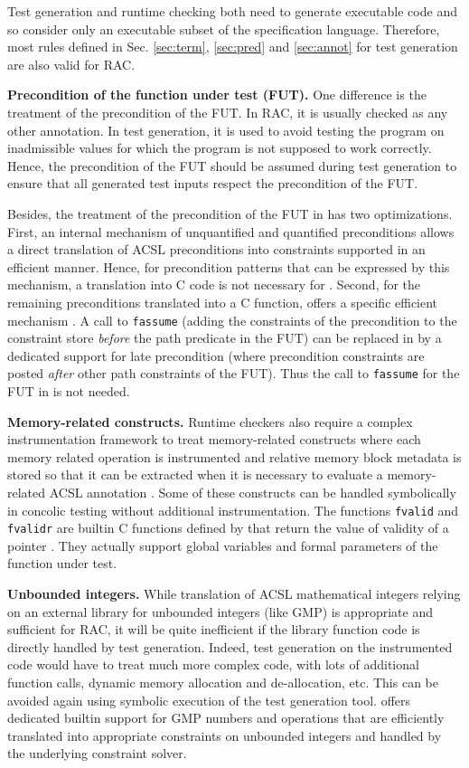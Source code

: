 Test generation and runtime checking both need to
generate executable code and so consider only an executable subset of the
specification language. 
Therefore, most rules defined in Sec. \ref{sec:term}, \ref{sec:pred} and \ref{sec:annot} 
for test generation are also valid for RAC.

\textbf{Precondition of the function under test (FUT).}
One difference is the treatment of the precondition of the FUT.
In RAC, it is usually checked as any other annotation.
In test generation, it is used to avoid testing the program on inadmissible values 
for which the program is not supposed to work correctly.
Hence, the precondition  of the FUT should be assumed during test generation
to ensure that all generated test inputs respect the precondition of the FUT.

Besides, the treatment of the precondition of the FUT in \pathcrawler has two optimizations.
First, an internal mechanism of unquantified and quantified preconditions
allows a direct translation of ACSL preconditions into constraints
supported in an efficient manner.
Hence, for precondition patterns that can be expressed by this mechanism,
a translation into C code is not necessary for \pathcrawler.
Second, for the remaining preconditions translated into a C function, 
\pathcrawler offers a specific
efficient mechanism \cite{Delahaye/RV13}.
A call to \lstinline|fassume| (adding the constraints of the
precondition to the constraint store \emph{before} the path predicate in the FUT)
can be replaced in \pathcrawler by a dedicated support for
late precondition (where precondition constraints are posted \emph{after}
other path constraints of the FUT).
Thus the call to \lstinline|fassume| for the FUT 
in \pathcrawler is not needed.

\textbf{Memory-related constructs.}
Runtime checkers also require a complex instrumentation framework
to treat memory-related constructs where each memory related operation
is instrumented and relative memory block metadata is stored
so that it can be extracted when it is necessary to evaluate a memory-related
ACSL annotation \cite{Kosmatov/RV13}.
Some of these constructs can be handled symbolically in
concolic testing without additional instrumentation.
The functions \lstinline|fvalid| and \lstinline|fvalidr| are builtin C functions
defined by \pathcrawler that return the value of validity of a pointer
\cite{testing-pointers}.
They actually support global variables and formal parameters of the function
under test.

\textbf{Unbounded integers.}
While translation of ACSL mathematical integers relying on an external library 
for unbounded integers (like GMP) is appropriate and sufficient for
RAC, it will be quite inefficient if the library function code is
directly handled by test generation.
Indeed, test generation on the instrumented code would have to 
treat much more complex code, with lots of additional function 
calls, dynamic memory allocation and de-allocation, etc.
This can be avoided again using symbolic execution of the test generation
tool. \pathcrawler offers dedicated builtin support 
for GMP numbers and operations that are efficiently translated into
appropriate constraints on unbounded integers and handled 
by the underlying constraint solver.

